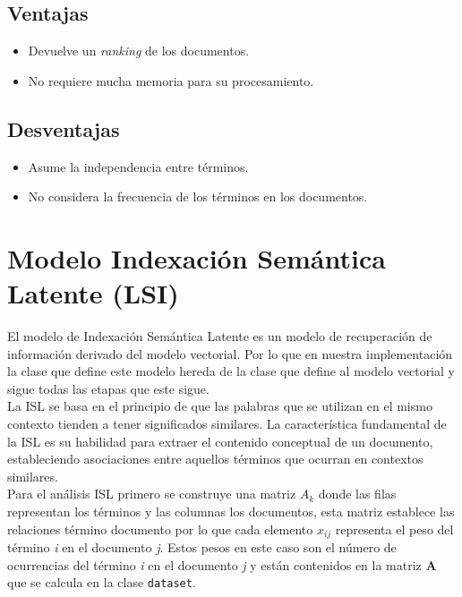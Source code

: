 \documentclass[spanish]{article}
\begin{document}
		\subsection*{Ventajas}
			\begin{itemize}
				\item Devuelve un \emph{ranking} de los documentos.
				\item No requiere mucha memoria para su procesamiento.
			\end{itemize}
		\subsection*{Desventajas}

			\begin{itemize}
				\item Asume la independencia entre términos.
				\item No considera la frecuencia de los términos en los documentos.
			\end{itemize}


\section*{ Modelo Indexación Semántica Latente (LSI)}

El modelo de Indexación Semántica Latente es un modelo de recuperación de información derivado del modelo vectorial. Por lo que en nuestra implementación la clase que define este modelo hereda de la clase que define al modelo vectorial y sigue todas las etapas que este sigue.\\

La ISL se basa en el principio de que las palabras que se utilizan en el mismo contexto tienden a tener significados similares. La característica fundamental de la ISL es su habilidad para extraer el contenido conceptual de un documento, estableciendo asociaciones entre aquellos términos que ocurran en contextos similares. \\

Para el análisis ISL primero se construye una matriz ${\displaystyle A_{k}}$ donde las filas representan los términos y las columnas los documentos, esta matriz establece las relaciones término documento por lo que cada elemento  $x_{ij}$  representa el peso del término \textit{i} en el documento \textit{j}. Estos pesos en este caso son el número de ocurrencias del término \textit{i} en el documento \textit{j} y están contenidos en la matriz \textbf{A} que se calcula en la clase \texttt{dataset}.\\
\end{document}

